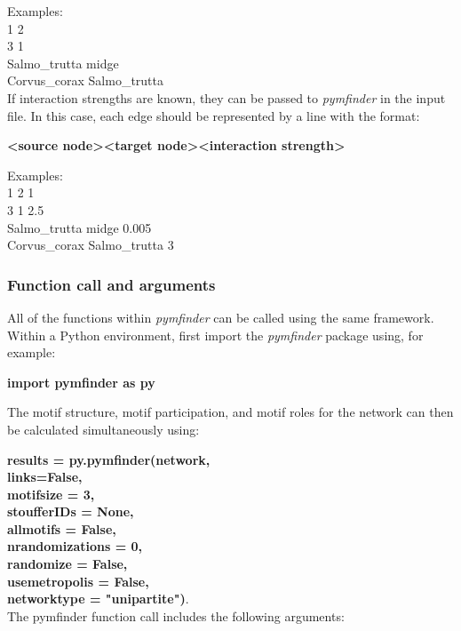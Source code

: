\documentclass[12pt]{article}
\begin{document}
			Examples:\\
			1 2\\
			3 1\\
			Salmo\_trutta midge\\
			Corvus\_corax Salmo\_trutta\\


			If interaction strengths are known, they can be passed to \emph{pymfinder} in the input file. In this case, each edge should be represented by a line with the format:

			\textbf{\textless source node\textgreater \textless target node\textgreater \textless interaction strength\textgreater}

			Examples:\\
			1 2 1\\
			3 1 2.5\\
			Salmo\_trutta midge 0.005\\
			Corvus\_corax Salmo\_trutta 3\\

		\subsubsection{Function call and arguments}

			All of the functions within \emph{pymfinder} can be called using the same framework. Within a Python environment, first import the \emph{pymfinder} package using, for example:

			\textbf{import pymfinder as py}

			The motif structure, motif participation, and motif roles for the network can then be calculated simultaneously using:

			\textbf{results = py.pymfinder(network,\\
								links=False,\\
	              motifsize = 3,\\
	              stoufferIDs = None,\\
	              allmotifs = False,\\
	              nrandomizations = 0,\\
	              randomize = False,\\
	              usemetropolis = False,\\
	              networktype = "unipartite")}.\\


			The pymfinder function call includes the following arguments:
\end{document}
